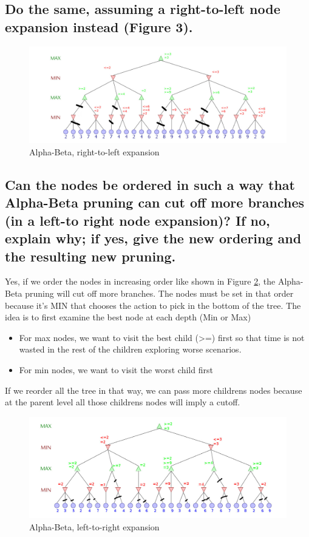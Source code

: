 \documentclass[10pt,a4paper]{article}
\begin{document}
\subsection{Do the same, assuming a right-to-left node expansion instead (Figure 3).}

\begin{figure}[h]
\includegraphics[scale=0.4]{img/alphabeta_right.jpg} 
\caption{\label{alphabetaright} Alpha-Beta, right-to-left expansion}
\end{figure}

\subsection{Can the nodes be ordered in such a way that Alpha-Beta pruning can cut off more branches (in a left-to right node expansion)? If no, explain why; if yes, give the new ordering and the resulting new pruning.}

Yes, if we order the nodes in increasing order like shown in Figure \ref{alphabetanodes}, the Alpha-Beta pruning will cut off more branches. The nodes must be set in that order because it's MIN that chooses the action to pick in the bottom of the tree.
The idea is to first examine the best node at each depth (Min or Max) \\
\begin{itemize}
	\item For max nodes, we want to visit the best child (>=) first so that time is not wasted in the rest of the children exploring worse scenarios.
	\item For min nodes, we want to visit the worst child first
\end{itemize}
If we reorder all the tree in that way, we can pass more childrens nodes because at the parent level all those childrens nodes will imply a cutoff.


\begin{figure}[h]
\includegraphics[scale=0.4]{img/alphabeta_nodes.jpg} 
\caption{\label{alphabetanodes} Alpha-Beta, left-to-right expansion}
\end{figure}
\end{document}
